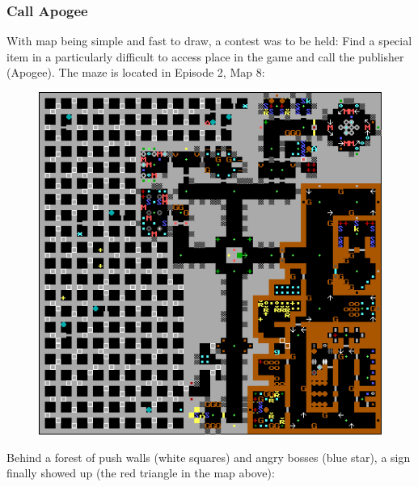 \subsubsection{Call Apogee}
With map being simple and fast to draw, a contest was to be held: Find a special item in a particularly difficult to access place in the game and call the publisher (Apogee). The maze is located in Episode 2, Map 8:\\
\par
\begin{figure}[H]
  \centering
 \includegraphics[width=\textwidth]{imgs/e2m8.png}
\end{figure}

\par
Behind a forest of push walls (white squares) and angry bosses (blue star), a sign finally showed up (the red triangle in the map above):\\
\par

